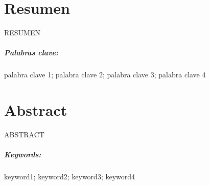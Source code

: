 \chapter*{Resumen}

RESUMEN

\paragraph{Palabras clave:} palabra clave 1; palabra clave 2; palabra clave 3; palabra clave 4 

\chapter*{Abstract}

ABSTRACT

\paragraph{Keywords:} keyword1; keyword2; keyword3; keyword4